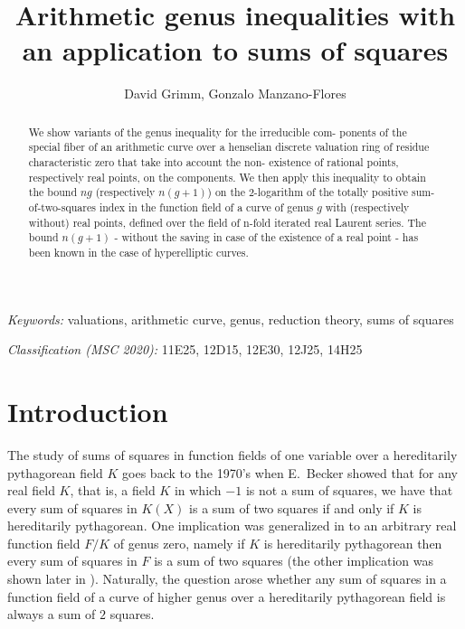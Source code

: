 \documentclass[a4paper,12pt,reqno]{amsart}
\author[D.~Grimm, G.~Manzano-Flores]{David Grimm, Gonzalo Manzano-Flores}
\title[Genus inequalities and sums of squares]{Arithmetic genus inequalities  with an application to sums of squares}
\theoremstyle{definition}
\numberwithin{equation}{thm}
\begin{document}
\begin{abstract}\noindent
We show variants of the genus inequality for the irreducible com-
ponents of the special fiber of an arithmetic curve over a henselian discrete
valuation ring of residue characteristic zero that take into account the non-
existence of rational points, respectively real points, on the components. We then
apply this inequality to obtain the bound $ng$ (respectively $n(g+1)$) on the $2$-logarithm of the
totally positive sum-of-two-squares index in the function field of a curve of
genus $g$ with (respectively without) real points, defined over the field of n-fold
iterated real Laurent series. The bound $n(g+1)$ - without the saving in case
of the existence of a real point - has been known in the case of hyperelliptic
curves.
\end{abstract}



\maketitle



\noindent
\textit{Keywords:}  valuations, arithmetic curve, genus, reduction theory, sums of squares
\medskip

\noindent
\textit{Classification (MSC 2020):} 11E25, 12D15, 12E30,
12J25, 14H25





\section{Introduction} %

The study of sums of squares in function fields of one variable over a hereditarily pythagorean field $K$ goes back to the 1970's when E.~Becker showed that for any real field $K$, that is, a field $K$ in which $-1$ is not a sum of squares, we have that every sum of squares in $K(X)$ is a sum of two squares if and only if $K$ is hereditarily pythagorean. One implication was generalized in \cite{TY03} to an arbitrary real function field $F/K$ of genus zero, namely if $K$ is hereditarily pythagorean then every sum of squares in $F$ is a sum of two squares (the other implication was shown later in \cite{Gr13}). Naturally, the question arose whether any sum of squares in a function field of a curve of higher genus over a hereditarily pythagorean field is always a sum of $2$ squares. 
\end{document}
